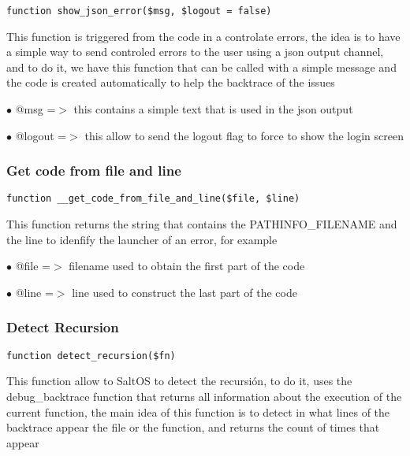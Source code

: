 \documentclass[a4paper]{article}
\begin{document}
\begin{lstlisting}
function show_json_error($msg, $logout = false)
\end{lstlisting}

This function is triggered from the code in a controlate errors, the idea is to have
a simple way to send controled errors to the user using a json output channel, and to
do it, we have this function that can be called with a simple message and the code
is created automatically to help the backtrace of the issues

\begin{compactitem}
\item[\color{myblue}$\bullet$] @msg    =$>$ this contains a simple text that is used in the json output
\item[\color{myblue}$\bullet$] @logout =$>$ this allow to send the logout flag to force to show the login screen
\end{compactitem}

\hypertarget{toc120}{}
\subsubsection{Get code from file and line}

\begin{lstlisting}
function __get_code_from_file_and_line($file, $line)
\end{lstlisting}

This function returns the string that contains the PATHINFO\_FILENAME and the line to idenfify
the launcher of an error, for example

\begin{compactitem}
\item[\color{myblue}$\bullet$] @file =$>$ filename used to obtain the first part of the code
\item[\color{myblue}$\bullet$] @line =$>$ line used to construct the last part of the code
\end{compactitem}

\hypertarget{toc121}{}
\subsubsection{Detect Recursion}

\begin{lstlisting}
function detect_recursion($fn)
\end{lstlisting}

This function allow to SaltOS to detect the recursión, to do it, uses the debug\_backtrace
function that returns all information about the execution of the current function, the
main idea of this function is to detect in what lines of the backtrace appear the file
or the function, and returns the count of times that appear
\end{document}
